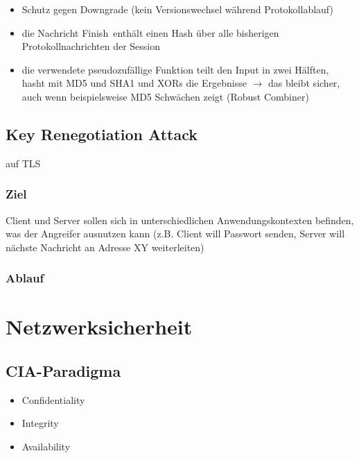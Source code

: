 \documentclass[a4paper,twoside,DIV15,BCOR12mm]{scrbook}
\begin{document}
\begin{itemize}
	\item Schutz gegen Downgrade (kein Versionswechsel während Protokollablauf)
	\item die Nachricht \glqq Finish\grqq\ enthält einen Hash über alle bisherigen Protokollnachrichten der Session
	\item die verwendete pseudozufällige Funktion teilt den Input in zwei Hälften, hasht mit MD5 und SHA1 und XORs die Ergebnisse $\rightarrow$ das bleibt sicher, auch wenn beispielsweise MD5 Schwächen zeigt (\glqq Robust Combiner\grqq)
\end{itemize}
		
\section{Key Renegotiation Attack}

auf TLS

\subsection{Ziel} 

Client und Server sollen sich in unterschiedlichen Anwendungskontexten befinden, was der Angreifer ausnutzen kann (z.B. Client will Passwort senden, Server will nächste Nachricht an Adresse XY weiterleiten)

\subsection{Ablauf}

	
	
\chapter{Netzwerksicherheit}

\section{CIA-Paradigma}

\begin{itemize}
	\item Confidentiality
	\item Integrity
	\item Availability
\end{itemize}
\end{document}
